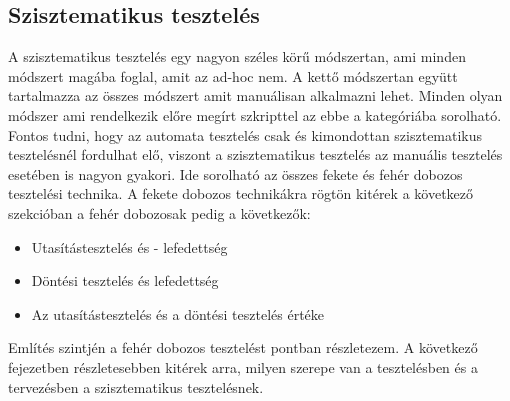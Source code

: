 \subsection{Szisztematikus tesztelés} A szisztematikus tesztelés egy nagyon széles körű módszertan, ami minden módszert magába foglal, amit az ad-hoc nem. A kettő módszertan együtt tartalmazza az összes módszert amit manuálisan alkalmazni lehet. Minden olyan módszer ami rendelkezik előre megírt szkripttel az ebbe a kategóriába sorolható. Fontos tudni, hogy az automata tesztelés csak és kimondottan szisztematikus tesztelésnél fordulhat elő, viszont a szisztematikus tesztelés az manuális tesztelés esetében is nagyon gyakori. Ide sorolható az összes fekete és fehér dobozos tesztelési technika. A fekete dobozos technikákra rögtön kitérek a következő szekcióban a fehér dobozosak pedig a következők:
\begin{itemize}
\item Utasítástesztelés és - lefedettség
\item Döntési tesztelés és lefedettség
\item Az utasítástesztelés és a döntési tesztelés értéke
\end{itemize}
Említés szintjén a fehér dobozos tesztelést   pontban részletezem.
\label{tab:sziszt}
A következő fejezetben részletesebben kitérek arra, milyen szerepe van a tesztelésben és a tervezésben a szisztematikus tesztelésnek.

